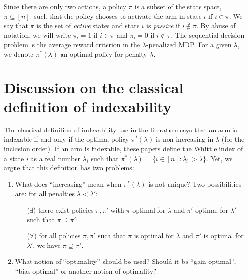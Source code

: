 Since there are only two actions, a policy $\pi$ is a subset of the state space, $\pi\subseteq[n]$, such that the policy chooses to activate the arm in state $i$ if $i\in\pi$.
We say that $\pi$ is the set of \emph{active} states and state $i$ is \emph{passive} if $i\not\in\pi$.
By abuse of notation, we will write $\pi_i=1$ if $i\in\pi$ and $\pi_i=0$ if $i\not\in\pi$. 
The sequential decision problem is the average reward criterion in the $\lambda$-penalized MDP.
For a given $\lambda$, we denote $\pi^*(\lambda)$ an optimal policy for penalty $\lambda$.  %


\section{Discussion on the classical definition of indexability}
\label{ch:idx:sec:classic_idx}

The classical definition of indexability use in the literature \citep{whittle1996optimal,akbarzadeh2020conditions,nino2020fast,gibson2021novel,nakhleh2021neurwin} says that an arm is indexable if and only if the optimal policy $\pi^*(\lambda)$ is non-increasing in $\lambda$ (for the inclusion order).
If an arm is indexable, these papers define the Whittle index of a state $i$ as a real number $\lambda_i$ such that ${\pi^*(\lambda)=\{i\in[n]: \lambda_i\ > \lambda\}}$.
Yet, we argue that this definition has two problems:
\begin{enumerate}
    \item What does ``increasing'' mean when $\pi^*(\lambda)$ is not unique? Two possibilities are: for all penalties $\lambda<\lambda'$:
    \begin{enumerate}
        \item[($\exists$)] there exist policies $\pi,\pi'$ with $\pi$ optimal for $\lambda$ and $\pi'$ optimal for $\lambda'$ such that $\pi\supseteq\pi'$;
        \item[($\forall$)] for all policies $\pi,\pi'$ such that  $\pi$ is optimal for $\lambda$ and $\pi'$ is optimal for $\lambda'$, we have $\pi\supseteq\pi'$.
    \end{enumerate}
    \item What notion of ``optimality'' should be used? Should it be ``gain optimal'', ``bias optimal'' or another notion of optimality?
\end{enumerate}

